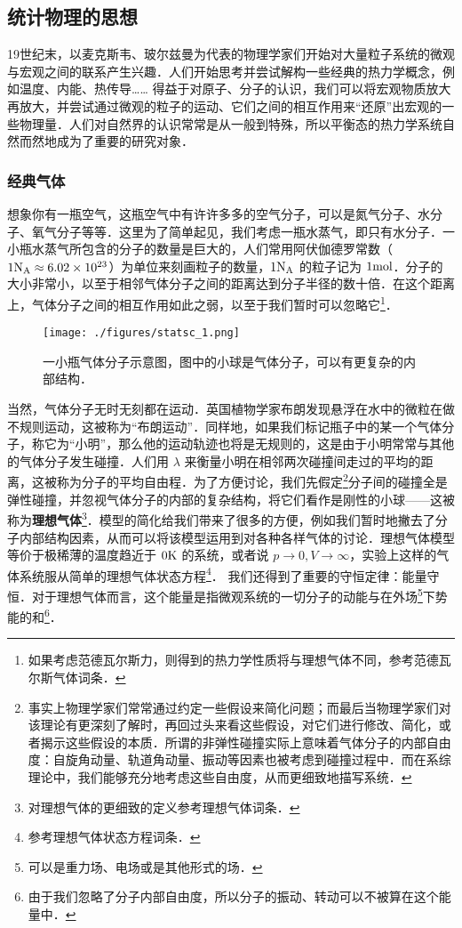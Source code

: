 \subsection{统计物理的思想}
19世纪末，以麦克斯韦、玻尔兹曼为代表的物理学家们开始对大量粒子系统的微观与宏观之间的联系产生兴趣．人们开始思考并尝试解构一些经典的热力学概念，例如温度、内能、热传导…… 得益于对原子、分子的认识，我们可以将宏观物质放大再放大，并尝试通过微观的粒子的运动、它们之间的相互作用来“还原”出宏观的一些物理量．人们对自然界的认识常常是从一般到特殊，所以平衡态的热力学系统自然而然地成为了重要的研究对象．
\subsubsection{经典气体}
想象你有一瓶空气，这瓶空气中有许许多多的空气分子，可以是氮气分子、水分子、氧气分子等等．这里为了简单起见，我们考虑一瓶水蒸气，即只有水分子．一小瓶水蒸气所包含的分子的数量是巨大的，人们常用阿伏伽德罗常数（$1 {\rm N_A}\approx 6.02\times 10^{23}$）为单位来刻画粒子的数量，$1 {\rm N_A}$ 的粒子记为 $1 {\rm mol}$．分子的大小非常小，以至于相邻气体分子之间的距离达到分子半径的数十倍．在这个距离上，气体分子之间的相互作用如此之弱，以至于我们暂时可以忽略它\footnote{如果考虑范德瓦尔斯力，则得到的热力学性质将与理想气体不同，参考范德瓦尔斯气体词条．}．

\begin{figure}[ht]
\centering
\texttt{[image: ./figures/statsc\_1.png]}
\caption{一小瓶气体分子示意图，图中的小球是气体分子，可以有更复杂的内部结构．} \label{statsc_fig1}
\end{figure}
当然，气体分子无时无刻都在运动．英国植物学家布朗发现悬浮在水中的微粒在做不规则运动，这被称为“布朗运动”．同样地，如果我们标记瓶子中的某一个气体分子，称它为“小明”，那么他的运动轨迹也将是无规则的，这是由于小明常常与其他的气体分子发生碰撞．人们用 $\lambda$ 来衡量小明在相邻两次碰撞间走过的平均的距离，这被称为分子的平均自由程．为了方便讨论，我们先假定\footnote{事实上物理学家们常常通过约定一些假设来简化问题；而最后当物理学家们对该理论有更深刻了解时，再回过头来看这些假设，对它们进行修改、简化，或者揭示这些假设的本质．所谓的非弹性碰撞实际上意味着气体分子的内部自由度：自旋角动量、轨道角动量、振动等因素也被考虑到碰撞过程中．而在系综理论中，我们能够充分地考虑这些自由度，从而更细致地描写系统．}分子间的碰撞全是弹性碰撞，并忽视气体分子的内部的复杂结构，将它们看作是刚性的小球——这被称为\textbf{理想气体}\footnote{对理想气体的更细致的定义参考理想气体词条．}．模型的简化给我们带来了很多的方便，例如我们暂时地撇去了分子内部结构因素，从而可以将该模型运用到对各种各样气体的讨论．理想气体模型等价于极稀薄的温度趋近于 $0 \rm K$ 的系统，或者说 $p\rightarrow 0,V\rightarrow \infty$，实验上这样的气体系统服从简单的理想气体状态方程\footnote{参考理想气体状态方程词条．}．
我们还得到了重要的守恒定律：能量守恒．对于理想气体而言，这个能量是指微观系统的一切分子的动能与在外场\footnote{可以是重力场、电场或是其他形式的场．}下势能的和\footnote{由于我们忽略了分子内部自由度，所以分子的振动、转动可以不被算在这个能量中．}．


